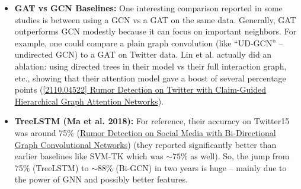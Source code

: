 \documentclass[12pt,a4paper]{report}
\begin{document}
\begin{itemize}[leftmargin=1.2cm]
    \item \textbf{GAT vs GCN Baselines:} One interesting comparison reported in some studies is between using a GCN vs a GAT on the same data. Generally, GAT outperforms GCN modestly because it can focus on important neighbors. For example, one could compare a plain graph convolution (like “UD-GCN” – undirected GCN) to a GAT on Twitter data. Lin et al. actually did an ablation: using directed trees in their model vs their full interaction graph, etc., showing that their attention model gave a boost of several percentage points (\href{https://ar5iv.org/pdf/2110.04522#:~:text=ClaHi,837}{[2110.04522] Rumor Detection on Twitter with Claim-Guided Hierarchical Graph Attention Networks}).
    \item \textbf{TreeLSTM (Ma et al. 2018):} For reference, their accuracy on Twitter15 was around 75\% (\href{https://ojs.aaai.org/index.php/AAAI/article/view/5393/5249#:~:text=SVM,482}{Rumor Detection on Social Media with Bi-Directional Graph Convolutional Networks}) (they reported significantly better than earlier baselines like SVM-TK which was \(\sim75\%\) as well). So, the jump from 75\% (TreeLSTM) to \(\sim88\%\) (Bi-GCN) in two years is huge – mainly due to the power of GNN and possibly better features.
\end{itemize}
\end{document}
